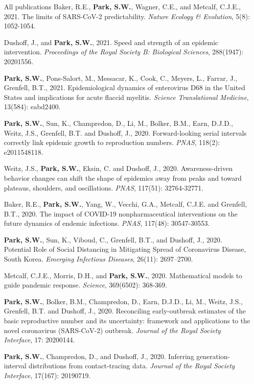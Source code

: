 \documentclass[
	11pt, %
]{resume} %
\begin{document}
\begin{rSection}{All publications}
Baker, R.E., \textbf{Park, S.W.}, Wagner, C.E., and Metcalf, C.J.E., 2021. The limits of SARS-CoV-2 predictability. \textit{Nature Ecology \& Evolution}, 5(8): 1052-1054.

Dushoff, J., and \textbf{Park, S.W.}, 2021. Speed and strength of an epidemic intervention. \textit{Proceedings of the Royal Society B: Biological Sciences}, 288(1947): 20201556.

\textbf{Park, S.W.}, Pons-Salort, M., Messacar, K., Cook, C., Meyers, L., Farrar, J., Grenfell, B.T., 2021. Epidemiological dynamics of enterovirus D68 in the United States and implications for acute flaccid myelitis. \textit{Science Translational Medicine}, 13(584): eabd2400.

\textbf{Park, S.W.}, Sun, K., Champredon, D., Li, M., Bolker, B.M., Earn, D.J.D., Weitz, J.S., Grenfell, B.T. and Dushoff, J., 2020. Forward-looking serial intervals correctly link epidemic growth to reproduction numbers. \textit{PNAS}, 118(2): e2011548118.

Weitz, J.S., \textbf{Park, S.W.}, Eksin, C. and Dushoff, J., 2020. Awareness-driven behavior changes can shift the shape of epidemics away from peaks and toward plateaus, shoulders, and oscillations. \textit{PNAS}, 117(51): 32764-32771.

Baker, R.E., \textbf{Park, S.W.}, Yang, W., Vecchi, G.A., Metcalf, C.J.E. and Grenfell, B.T., 2020. The impact of COVID-19 nonpharmaceutical interventions on the future dynamics of endemic infections. \textit{PNAS}, 117(48): 30547-30553.

\textbf{Park, S.W.}, Sun, K., Viboud, C., Grenfell, B.T., and Dushoff, J., 2020. Potential Role of Social Distancing in Mitigating Spread of Coronavirus Disease, South Korea. \textit{Emerging Infectious Diseases}, 26(11): 2697–2700.

Metcalf, C.J.E., Morris, D.H., and \textbf{Park, S.W.}, 2020. Mathematical models to guide pandemic response. \textit{Science}, 369(6502): 368-369.

\textbf{Park, S.W.}, Bolker, B.M., Champredon, D., Earn, D.J.D., Li, M., Weitz, J.S., Grenfell, B.T. and Dushoff, J., 2020. Reconciling early-outbreak estimates of the basic reproductive number and its uncertainty: framework and applications to the novel coronavirus (SARS-CoV-2) outbreak. \textit{Journal of the Royal Society Interface}, 17: 20200144.

\textbf{Park, S.W.}, Champredon, D., and Dushoff, J., 2020. Inferring generation-interval distributions from contact-tracing data. \textit{Journal of the Royal Society Interface}, 17(167): 20190719.


\end{rSection}
\end{document}
